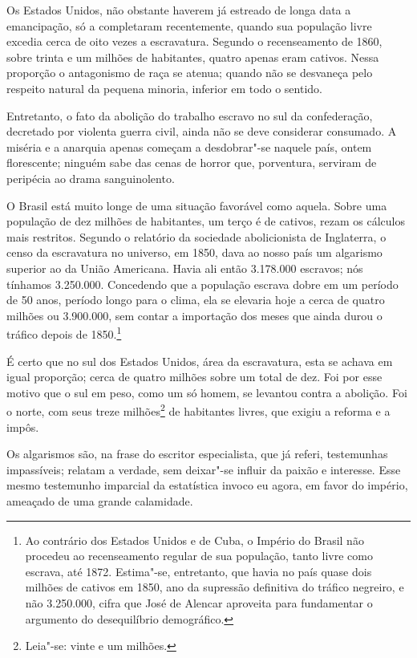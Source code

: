 Os Estados Unidos, não obstante haverem já estreado de longa data a
emancipação, só a completaram recentemente, quando sua população livre
excedia cerca de oito vezes a escravatura. Segundo o recenseamento de
1860, sobre trinta e um milhões de habitantes, quatro apenas eram
cativos. Nessa proporção o antagonismo de raça se atenua; quando não se
desvaneça pelo respeito natural da pequena minoria, inferior em todo o sentido.

Entretanto, o fato da abolição do trabalho escravo no sul da
confederação, decretado por violenta guerra civil, ainda não se deve
considerar consumado. A miséria e a anarquia apenas começam a
desdobrar"-se naquele país, ontem florescente; ninguém sabe das cenas
de horror que, porventura, serviram de peripécia ao drama sanguinolento. 

O Brasil está muito longe de uma situação favorável como aquela. Sobre
uma população de dez milhões de habitantes, um terço é de cativos,
rezam os cálculos mais restritos. Segundo o relatório da sociedade
abolicionista de Inglaterra, o censo da escravatura no universo, em
1850, dava ao nosso país um algarismo superior ao da União Americana.
Havia ali então 3.178.000 escravos; nós tínhamos 3.250.000. Concedendo
que a população escrava dobre em um período de 50 anos, período longo
para o clima, ela se elevaria hoje a cerca de quatro milhões ou
3.900.000, sem contar a importação dos meses que ainda durou o tráfico
depois de 1850.\footnote{ Ao contrário dos Estados Unidos e de Cuba, o Império do Brasil não
procedeu ao recenseamento regular de sua população, tanto livre como
escrava, até 1872. Estima"-se, entretanto, que havia no país quase
dois milhões de cativos em 1850, ano da supressão definitiva do tráfico
negreiro, e não 3.250.000, cifra que José de Alencar aproveita para
fundamentar o argumento do desequilíbrio demográfico.}
 

É certo que no sul dos Estados Unidos, área da escravatura, esta se
achava em igual proporção; cerca de quatro milhões sobre um total de
dez. Foi por esse motivo que o sul em peso, como um só homem, se
levantou contra a abolição. Foi o norte, com seus treze milhões\footnote{Leia"-se: vinte e um milhões.} de habitantes livres, que exigiu a reforma e a impôs.

Os algarismos são, na frase do escritor especialista, que já referi,
testemunhas impassíveis; relatam a verdade, sem deixar"-se influir da
paixão e interesse. Esse mesmo testemunho imparcial da estatística
invoco eu agora, em favor do império, ameaçado de uma grande calamidade.

